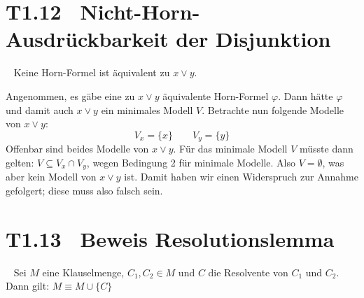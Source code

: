 \documentclass[fontsize=11pt, twoside=false, numbers=autoenddot]{scrbook}
\begin{document}
\section*{T1.12~ Nicht-Horn-Ausdrückbarkeit der Disjunktion}

\enlargethispage{7mm}
~
Keine Horn-Formel ist äquivalent zu $x \lor y$.

\par\noindent
\begin{beweis}
  Angenommen, es gäbe eine zu $x \lor y$ äquivalente Horn-Formel $\varphi$.
  Dann hätte $\varphi$ und damit auch $x \lor y$ ein minimales Modell $V$.
  Betrachte nun folgende Modelle von $x \lor y$:
  \[
    V_x = \{x\} \qquad V_y = \{y\}
  \]
  Offenbar sind beides Modelle von $x \lor y$.
  Für das minimale Modell $V$ müsste dann gelten:
  $V \subseteq V_x \cap V_y$, wegen Bedingung 2 für minimale Modelle.
  Also $V = \emptyset$, was aber kein Modell von $x \lor y$ ist.
  Damit haben wir einen Widerspruch zur Annahme gefolgert;
  diese muss also falsch sein.\qedhere
\end{beweis}%

\section*{T1.13~ Beweis Resolutionslemma}

~
Sei $M$ eine Klauselmenge, $C_1, C_2 \in M$ und $C$ die Resolvente von $C_1$ und $C_2$.
Dann gilt: $M \equiv M \cup \{C\}$
\end{document}
